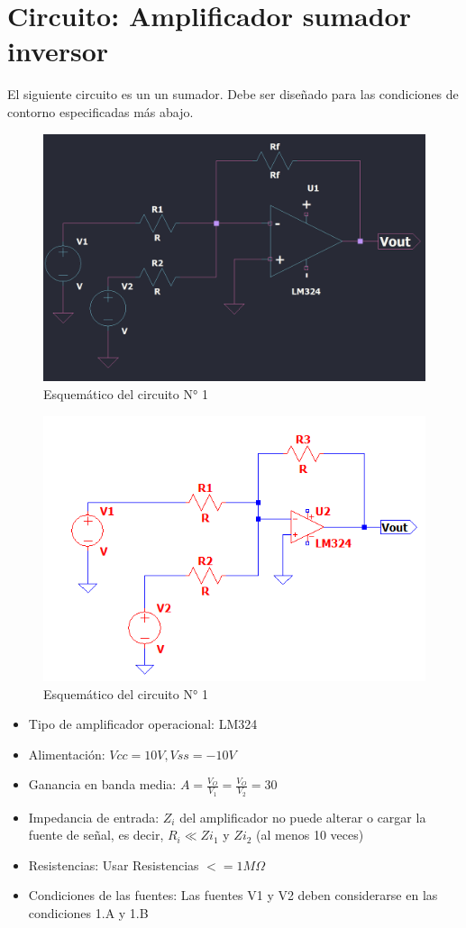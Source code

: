 \section{Circuito: Amplificador sumador inversor}

El siguiente circuito es un un sumador. Debe ser diseñado para las condiciones de contorno especificadas más abajo.

\begin{figure}[h!]
    \centering
    \includegraphics[width=0.90\linewidth]{img/esquematico_complete.png}
    \caption{Esquemático del circuito N° 1}
    \label{fig:esquematico}
\end{figure}

\begin{figure}
    \centering
    \includegraphics[width=0.5\linewidth]{img/Circuito1.png}
    \caption{Esquemático del circuito N° 1}
    \label{fig:enter-label}
\end{figure}

\begin{itemize}
  \item Tipo de amplificador operacional: LM324
  \item Alimentación: $Vcc = 10V, Vss = -10V$
  \item Ganancia en banda media: $A = \frac{V_O}{V_1} = \frac{V_O}{V_2} = 30$
  \item Impedancia de entrada: $Z_i$ del amplificador no puede alterar o cargar la fuente de señal, es decir, $R_i  \ll Zi_1$ y $Zi_2$ (al menos 10 veces)
  
  \item Resistencias: Usar Resistencias $<= 1M \Omega$
  \item Condiciones de las fuentes: Las fuentes V1 y V2 deben considerarse en las condiciones 1.A y 1.B

\end{itemize}






